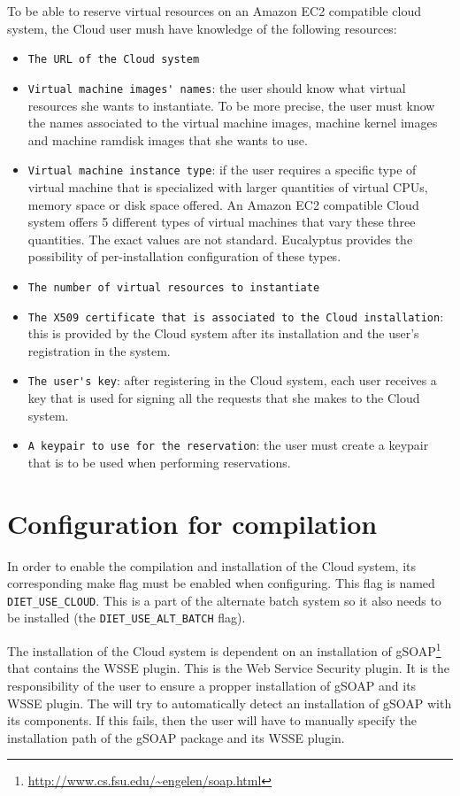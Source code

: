 To be able to reserve virtual resources on an Amazon EC2 compatible cloud system, the Cloud user
mush have knowledge of the following resources:
\begin{itemize}
\item \verb!The URL of the Cloud system!
\item \verb!Virtual machine images' names!: the user should know what virtual resources she wants
to instantiate. To be more precise, the user must know the names associated to the virtual machine
images, machine kernel images and machine ramdisk images that she wants to use.
\item \verb!Virtual machine instance type!: if the user requires a specific type of virtual machine
that is specialized with larger quantities of virtual CPUs, memory space or disk space offered.
An Amazon EC2 compatible Cloud system offers 5 different types of virtual machines that vary these
three quantities. The exact values are not standard. Eucalyptus provides the possibility of
per-installation configuration of these types.
\item \verb!The number of virtual resources to instantiate!
\item \verb!The X509 certificate that is associated to the Cloud installation!: this is provided by
the Cloud system after its installation and the user's registration in the system.
\item \verb!The user's key!: after registering in the Cloud system, each user receives a key
that is used for signing all the requests that she makes to the Cloud system.
\item \verb!A keypair to use for the reservation!: the user must create a keypair that is to be used
when performing reservations.
\end{itemize}


\section{Configuration for compilation}

In order to enable the compilation and installation of the \diet Cloud system, its corresponding make flag
must be enabled when configuring. This flag is named \verb!DIET_USE_CLOUD!. This is a part of
the alternate batch system so it also needs to be installed (the \verb!DIET_USE_ALT_BATCH! flag).

The installation of the Cloud system is dependent on an installation of gSOAP\footnote{\url{http://www.cs.fsu.edu/~engelen/soap.html}}
that contains the WSSE plugin.
This is the Web Service Security plugin. It is the responsibility of the \diet user to ensure a propper
installation of gSOAP and its WSSE plugin. The will try to automatically detect an installation of gSOAP
with its components. If this fails, then the \diet user will have to manually specify the installation
path of the gSOAP package and its WSSE plugin.

